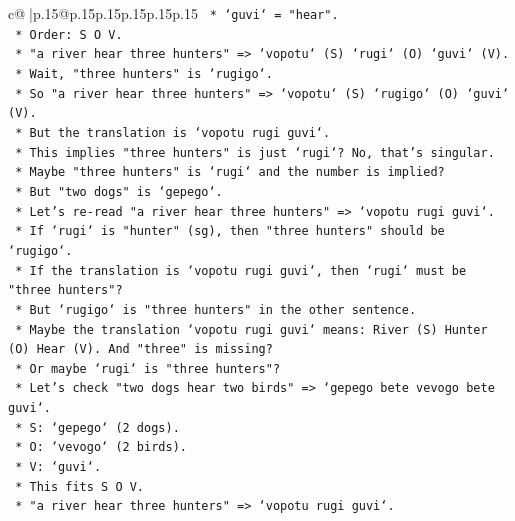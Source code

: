 \documentclass{article}
\begin{document}
{\begin{supertabular}{c@{$\;$}|p{.15\linewidth}@{}p{.15\linewidth}p{.15\linewidth}p{.15\linewidth}p{.15\linewidth}p{.15\linewidth}}
{{{\texttt{                    *   `guvi` = "hear".} \\
\texttt{                    *   Order: S O V.} \\
\texttt{                    *   "a river hear three hunters" => `vopotu` (S) `rugi` (O) `guvi` (V).} \\
\texttt{                    *   Wait, "three hunters" is `rugigo`.} \\
\texttt{                    *   So "a river hear three hunters" => `vopotu` (S) `rugigo` (O) `guvi` (V).} \\
\texttt{                    *   But the translation is `vopotu rugi guvi`.} \\
\texttt{                    *   This implies "three hunters" is just `rugi`? No, that's singular.} \\
\texttt{                    *   Maybe "three hunters" is `rugi` and the number is implied?} \\
\texttt{                    *   But "two dogs" is `gepego`.} \\
\texttt{                    *   Let's re{-}read "a river hear three hunters" => `vopotu rugi guvi`.} \\
\texttt{                    *   If `rugi` is "hunter" (sg), then "three hunters" should be `rugigo`.} \\
\texttt{                    *   If the translation is `vopotu rugi guvi`, then `rugi` must be "three hunters"?} \\
\texttt{                    *   But `rugigo` is "three hunters" in the other sentence.} \\
\texttt{                    *   Maybe the translation `vopotu rugi guvi` means: River (S) Hunter (O) Hear (V). And "three" is missing?} \\
\texttt{                    *   Or maybe `rugi` is "three hunters"?} \\
\texttt{                    *   Let's check "two dogs hear two birds" => `gepego bete vevogo bete guvi`.} \\
\texttt{                        *   S: `gepego` (2 dogs).} \\
\texttt{                        *   O: `vevogo` (2 birds).} \\
\texttt{                        *   V: `guvi`.} \\
\texttt{                        *   This fits S O V.} \\
\texttt{                    *   "a river hear three hunters" => `vopotu rugi guvi`.} \\
}}}
\end{supertabular}}
\end{document}
